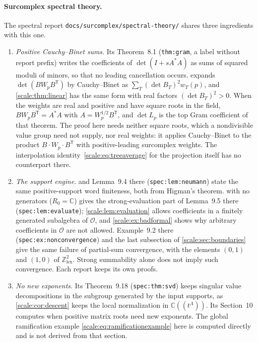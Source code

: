 \documentclass[11pt,a4paper]{article}
\numberwithin{equation}{section}
\theoremstyle{definition}
\newcommand{\C}{\mathbb C}
\newcommand{\Z}{\mathbb Z}
\newcommand{\OO}{\mathcal O}
\begin{document}
\paragraph{Surcomplex spectral theory.}
The spectral report \nolinkurl{docs/surcomplex/spectral-theory/}
\cite{RepoSpectral} shares three ingredients with this one.
\begin{enumerate}[label=(\alph*)]
\item \emph{Positive Cauchy--Binet sums.} Its Theorem~8.1
(\nolinkurl{thm:gram}, a label without report prefix) writes the coefficients of
$\det(I+sA^*A)$ as sums of squared moduli of minors, so that no leading
cancellation occurs.  expands
$\det(BW_pB^{\mathsf T})$ by Cauchy--Binet as
$\sum_T(\det B_T)^2w_T(p)$, and \cref{scale:thm:linear} has the same form
with real factors $(\det B_T)^2>0$. When the weights are real and positive
and have square roots in the field, $BW_pB^{\mathsf T}=A^*A$ with
$A=W_p^{1/2}B^{\mathsf T}$, and $\det L_p$ is the top Gram coefficient of that
theorem. The proof here needs neither square roots, which a nondivisible
value group need not supply, nor real weights: it applies Cauchy--Binet to
the product $B\cdot W_p\cdot B^{\mathsf T}$ with positive-leading surcomplex
weights. The interpolation identity~\eqref{scale:eq:treeaverage} for the
projection itself has no counterpart there.
\item \emph{The support engine.}  and Lemma~9.4
there (\nolinkurl{spec:lem:neumann}) state the same positive-support word
finiteness, both from Higman's theorem.  with no
generators ($R_0=\C$) gives the strong-evaluation part of Lemma~9.5 there
(\nolinkurl{spec:lem:evaluate}); \cref{scale:lem:evaluation} allows coefficients
in a finitely generated subalgebra of $\OO$, and \cref{scale:ex:badformal}
shows why arbitrary coefficients in $\OO$ are not allowed. Example~9.2 there
(\nolinkurl{spec:ex:nonconvergence}) and the last subsection of
\cref{scale:sec:boundaries} give the same failure of partial-sum convergence,
with the elements $(0,1)$ and $(1,0)$ of $\Z^2_{\mathrm{lex}}$.
Strong summability alone does not imply such convergence. Each report keeps its own proofs.
\item \emph{No new exponents.} Its Theorem~9.18 (\nolinkurl{spec:thm:svd}) keeps
singular value decompositions in the subgroup generated by the input
supports, as \cref{scale:cor:descent} keeps the local normalization in
$\C((t^\Lambda))$. Its Section~10 computes when positive matrix roots need
new exponents. The global ramification example
\eqref{scale:eq:ramificationexample} here is computed directly and is not
derived from that section.
\end{enumerate}
\end{document}
